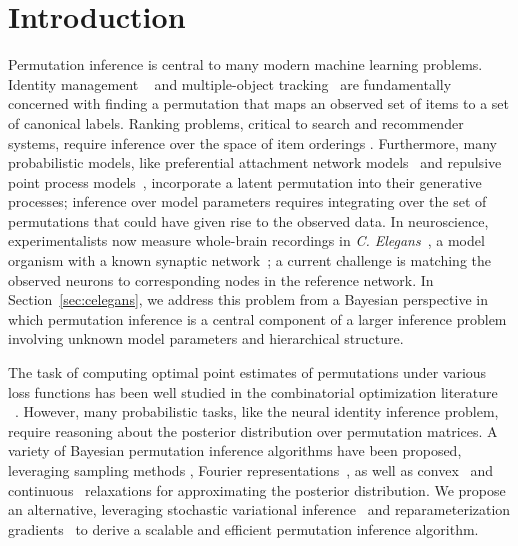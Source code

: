 \documentclass[twoside]{article}
\begin{document}
\section{Introduction}

Permutation inference is central to many modern machine learning
problems.  Identity management ~\citep{guibas2008identity} and
multiple-object tracking~\citep{shin2005lazy, kondor2007multi} are
fundamentally concerned with finding a permutation that maps an
observed set of items to a set of canonical labels.  Ranking problems,
critical to search and recommender systems, require inference over the
space of item orderings \citep{meilua2007consensus, lebanon2008non,
  adams2011ranking}.  Furthermore, many probabilistic models, like
preferential attachment network models~\citep{bloem2016random} and
repulsive point process models~\citep{rao2016bayesian}, incorporate a
latent permutation into their generative processes; inference over
model parameters requires integrating over the set of permutations
that could have given rise to the observed data.  In neuroscience,
experimentalists now measure whole-brain recordings in
\textit{C. Elegans}~\citep{Kato2015, nguyen2016whole}, a model
organism with a known synaptic network~\citep{white1986structure}; a
current challenge is matching the observed neurons to corresponding
nodes in the reference network.  In Section~\ref{sec:celegans}, we
address this problem from a Bayesian perspective in which permutation
inference is a central component of a larger inference problem involving
unknown model parameters and hierarchical structure.

The task of computing optimal point estimates of permutations under
various loss functions has been well studied in the combinatorial
optimization literature ~\citep{kuhn1955hungarian,
  munkres1957algorithms, lawler1963quadratic}. However, many
probabilistic tasks, like the neural identity inference
problem, require reasoning about the posterior distribution over
permutation matrices.  A variety of Bayesian permutation inference
algorithms have been proposed, leveraging sampling methods
\citep{diaconis1988group, miller2013exact, harrison2013importance},
Fourier representations~\citep{kondor2007multi, huang2009fourier}, as
well as convex~\citep{lim2014beyond} and
continuous~\citep{plis2011directional} relaxations for approximating
the posterior distribution.  We propose an alternative, leveraging stochastic variational
inference~\citep{hoffman2013stochastic} and reparameterization
gradients~\citep{rezende2014stochastic, Kingma2014} to derive a
scalable and efficient permutation inference algorithm.
\end{document}
